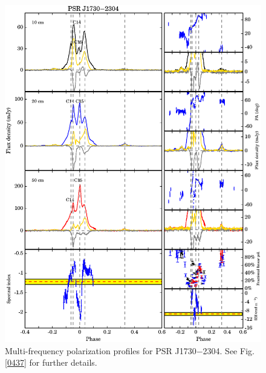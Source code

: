 \documentclass[useAMS,usenatbib]{mn2e}
\begin{document}
\begin{appendix}
\begin{figure}
\begin{center}
\includegraphics[width=6 in]{1730.ps}
\caption{Multi-frequency polarization profiles for PSR J1730$-$2304. 
See Fig. \ref{0437} for further details.}
\label{1730}
\end{center}
\end{figure}


\end{appendix}
\end{document}

